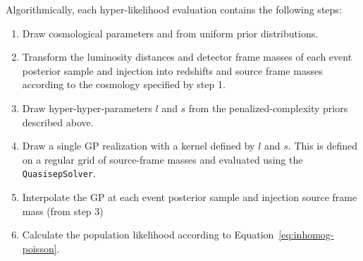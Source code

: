 \documentclass[]{aastex631}
\begin{document}
Algorithmically, each hyper-likelihood  evaluation contains the following steps: 
\begin{enumerate}
    \item Draw cosmological parameters \Ho{} and \Omm{} from uniform prior distributions.
    \item Transform the luminosity distances and detector frame masses of each event posterior sample and injection into redshifts and source frame masses according to the cosmology specified by step 1.
    \item Draw hyper-hyper-parameters $l$ and $s$ from the penalized-complexity priors described above.
    \item Draw a single \ac{GP} realization with a kernel defined by $l$ and $s$.
    This is defined on a regular grid of source-frame masses and evaluated using the \texttt{QuasisepSolver}.
    \item Interpolate the \ac{GP} at each event posterior sample and injection source frame mass (from step 3)
    \item Calculate the population likelihood according to Equation~\ref{eq:inhomog-poisson}.
\end{enumerate}
\end{document}
